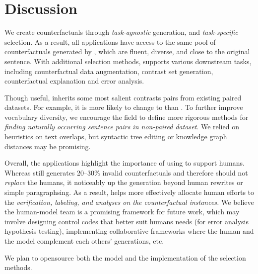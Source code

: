 \section{Discussion}
\label{sec:discuss}

We create counterfactuals through \emph{task-agnostic} generation, and \emph{task-specific} selection.
As a result, all applications have access to the same pool of counterfactuals generated by \sysname, which are fluent, diverse, and close to the original sentence.
With additional selection methods, \sysname supports various downstream tasks, including counterfactual data augmentation, contrast set generation, counterfactual explanation and error analysis.

Though useful, \sysname inherits some most salient contrasts pairs from existing paired datasets.
For example, it is more likely to change  to  than .
To further improve vocabulary diversity, we encourage the field to define more rigorous methods for \emph{finding naturally occurring sentence pairs in non-paired dataset}.
We relied on heuristics on text overlaps, but syntactic tree editing or knowledge graph distances may be promising.

Overall, the applications highlight the importance of using \sysname to support humans.
Whereas \sysname still generates 20--30\% invalid counterfactuals and therefore should not \emph{replace} the humans, it noticeably up the generation beyond human rewrites or simple paragraphsing. 
As a result, \sysname helps more effectively allocate human efforts to the \emph{verification, labeling, and analyses on the counterfactual instances.}
We believe the human-model team is a promising framework for future work, which may involve designing control codes that better suit humans needs (\eg for error analysis hypothesis testing), implementing collaborative frameworks where the human and the model complement each others' generations, etc.

We plan to opensource both the \sysname model and the implementation of the selection methods.




